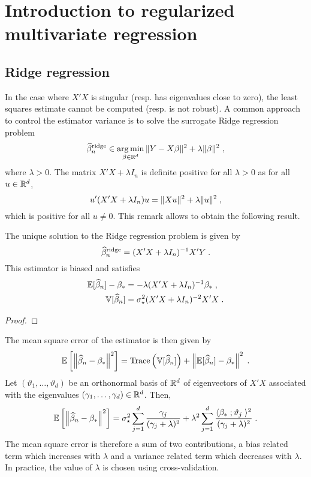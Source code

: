 \section{Introduction to regularized multivariate regression}
\subsection{Ridge regression}
In the case where $X'X$ is singular (resp. has eigenvalues close to zero), the least squares estimate cannot be computed (resp. is not robust). A common approach to control the estimator variance is to solve the surrogate Ridge regression problem
\[
\widehat \beta^{\mathrm{ridge}}_n\in  \argmin_{\beta\in\rset^d}  \|Y - X\beta\|^2 + \lambda\|\beta\|^2\eqsp,
\]
where $\lambda>0$. The matrix $X'X + \lambda I_n$ is definite positive for all $\lambda>0$ as for all $u\in\mathbb{R}^d$,
\[
u'(X'X + \lambda I_n)u = \|Xu\|^2 + \lambda \|u\|^2\;,
\]
which is positive for all $u\neq 0$. This remark allows to obtain the following result.

\begin{shaded}
\begin{proposition}
\label{prop:least:squares:ridge}
The unique solution to the Ridge regression problem is given by
\[
\widehat \beta^{\mathrm{ridge}}_n = (X'X + \lambda I_n)^{-1}X'Y\;.
\] 
This estimator is biased and satisfies 
\begin{align*}
\mathbb{E}[\widehat \beta_n] - \beta_*&= - \lambda(X'X + \lambda I_n)^{-1}\beta_*\;,\\
\mathbb{V}[\widehat \beta_n] &= \sigma_\star^2(X'X + \lambda I_n)^{-2}X'X \;.
\end{align*}
\end{proposition}
\end{shaded}
\begin{proof}

\end{proof}
The mean square error of the estimator is then given by
\[
\mathbb{E}\left[\left\|\widehat \beta_n-\beta_*\right\|^2\right] = \mathrm{Trace}\left(\mathbb{V}[\widehat \beta_n]\right) + \left\|\mathbb{E}[\widehat \beta_n] - \beta_*\right\|^2\;.
\]
Let $(\vartheta_1,\ldots,\vartheta_d)$ be an orthonormal basis of $\mathbb{R}^d$ of eigenvectors of $X'X$ associated with the eigenvalues $(\gamma_1,\ldots,\gamma_d)\in\mathbb{R}^d$. Then,
\[
\mathbb{E}\left[\left\|\widehat \beta_n-\beta_*\right\|^2\right] =  \sigma_\star^2 \sum_{j=1}^d \frac{\gamma_j}{(\gamma_j+\lambda)^2} + \lambda^2  \sum_{j=1}^d \frac{\langle \beta_* \;; \vartheta_j\;\rangle^2}{(\gamma_j+\lambda)^2}\;.
\]
The mean square error is therefore a sum of two contributions, a bias related term which increases with $\lambda$ and a variance related term which decreases with $\lambda$. In practice, the value of $\lambda$ is chosen using cross-validation.

